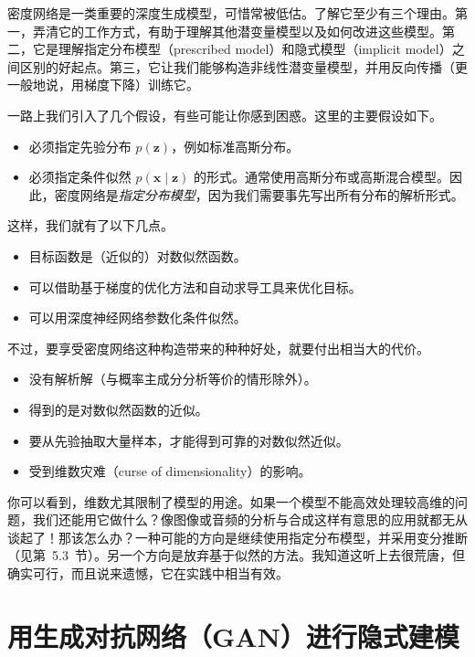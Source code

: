 密度网络是一类重要的深度生成模型，可惜常被低估。了解它至少有三个理由。第一，弄清它的工作方式，有助于理解其他潜变量模型以及如何改进这些模型。第二，它是理解指定分布模型（prescribed model）和隐式模型（implicit model）之间区别的好起点。第三，它让我们能够构造非线性潜变量模型，并用反向传播（更一般地说，用梯度下降）训练它。

一路上我们引入了几个假设，有些可能让你感到困惑。这里的主要假设如下。
\begin{itemize}
  \item 必须指定先验分布 $p(\mathbf z)$，例如标准高斯分布。
  \item 必须指定条件似然 $p(\mathbf x\mid\mathbf z)$ 的形式。通常使用高斯分布或高斯混合模型。因此，密度网络是\emph{指定分布模型}，因为我们需要事先写出所有分布的解析形式。
\end{itemize}
这样，我们就有了以下几点。
\begin{itemize}
  \item 目标函数是（近似的）对数似然函数。
  \item 可以借助基于梯度的优化方法和自动求导工具来优化目标。
  \item 可以用深度神经网络参数化条件似然。
\end{itemize}


不过，要享受密度网络这种构造带来的种种好处，就要付出相当大的代价。
\begin{itemize}
  \item 没有解析解（与概率主成分分析等价的情形除外）。
  \item 得到的是对数似然函数的近似。
  \item 要从先验抽取大量样本，才能得到可靠的对数似然近似。
  \item 受到维数灾难（curse of dimensionality）的影响。
\end{itemize}

你可以看到，维数尤其限制了模型的用途。如果一个模型不能高效处理较高维的问题，我们还能用它做什么？像图像或音频的分析与合成这样有意思的应用就都无从谈起了！那该怎么办？一种可能的方向是继续使用指定分布模型，并采用变分推断（见第~5.3~节）。另一个方向是放弃基于似然的方法。我知道这听上去很荒唐，但确实可行，而且说来遗憾，它在实践中相当有效。

\section{用生成对抗网络（GAN）进行隐式建模}
\label{sec:08-02}

